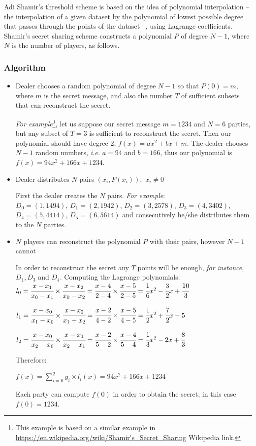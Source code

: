 Adi Shamir's threshold scheme is based on the idea of polynomial interpolation -- the interpolation of a given dataset by the polynomial of lowest possible degree that passes through the points of the dataset --, using Lagrange coefficients.
Shamir's secret sharing scheme constructs a polynomial $P$ of degree $N-1$, where $N$ is the number of players, as follows.


\subsubsection{Algorithm}\label{sss:shamir-algorithm}
\begin{itemize}
  \item Dealer chooses a random polynomial of degree $N − 1$ so that $P(0) = m$, where $m$ is the secret message, and also the number $T$ of sufficient subsets that can reconstruct the secret.

  \textit{For example\footnote{This example is based on a similar example in \url{https://en.wikipedia.org/wiki/Shamir's_Secret_Sharing} Wikipedia link.}}, let us suppose our secret message $m = 1234$ and $N = 6$ parties, but any subset of $T = 3$ is sufficient to reconstruct the secret.
  Then our polynomial should have degree 2, $f(x) = ax^2 + bx + m$.
  The dealer chooses $N - 1$ random numbers, \textit{i.e.} $a = 94$ and $b = 166$, thus our polynomial is $f(x) = 94x^2 + 166x + 1234$.


  \item Dealer distributes $N$ pairs $(x_i , P(x_i)),$ $x_i \neq 0$

  First the dealer creates the $N$ pairs.
  \textit{For example}:\\
  $D_0 = (1, 1494)$, $D_1 = (2, 1942)$, $D_2 = (3, 2578)$, $D_3 = (4, 3402)$, $D_4 = (5, 4414)$, $D_5 = (6, 5614)$ and consecutively he/she distributes them to the $N$ parties.


  \item $N$ players can reconstruct the polynomial $P$ with their pairs, however $N - 1$ cannot

  In order to reconstruct the secret any $T$ points will be enough, \textit{for instance}, $D_1, D_3$ and $D_4$.
  Computing the Lagrange polynomials:\\
  $l_0 = \cfrac{x - x_1}{x_0 - x_1} \times \cfrac{x - x_2}{x_0 - x_2} = \cfrac{x - 4}{2 - 4} \times \cfrac{x - 5}{2 - 5} = \cfrac{1}{6}x^2 - \cfrac{3}{2}x + \cfrac{10}{3}$

  $l_1 = \cfrac{x - x_0}{x_1 - x_0} \times \cfrac{x - x_2}{x_1 - x_2} = \cfrac{x - 2}{4 - 2} \times \cfrac{x - 5}{4 - 5} = \cfrac{1}{2}x^2 + \cfrac{7}{2}x - 5$

  $l_2 = \cfrac{x - x_0}{x_2 - x_0} \times \cfrac{x - x_1}{x_2 - x_1} = \cfrac{x - 2}{5 - 2} \times \cfrac{x - 4}{5 - 4} = \cfrac{1}{3}x^2 - 2x + \cfrac{8}{3}$

  Therefore:

  $f(x) = \sum_{i=0}^{2} y_i \times l_i(x) = 94x^2 + 166x + 1234$

  Each party can compute $f(0)$ in order to obtain the secret, in this case $f(0) = 1234$.
\end{itemize}

